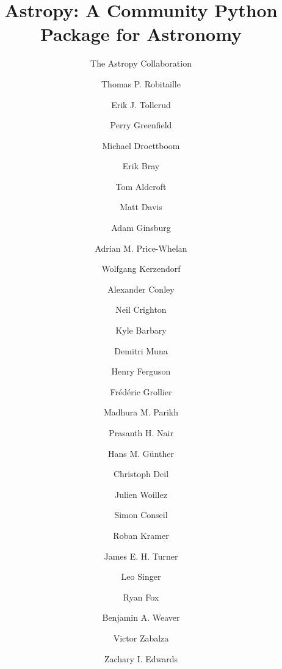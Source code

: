 \documentclass[traditabstract]{aa}
\begin{document}



\title{Astropy: A Community Python Package for Astronomy}




\author{
The Astropy Collaboration
  \and
Thomas P. Robitaille\inst{\ref{inst:mpia}}  %
  \and
Erik J. Tollerud\inst{\ref{inst:yale}, \ref{inst:hubble}}  %
  \and
Perry Greenfield\inst{\ref{inst:stsci}}  %
  \and
Michael Droettboom\inst{\ref{inst:stsci}}  %
  \and
Erik Bray\inst{\ref{inst:stsci}}  %
  \and
Tom Aldcroft\inst{\ref{inst:cfa}}  %
  \and
Matt Davis\inst{\ref{inst:stsci}}  %
  \and
Adam Ginsburg\inst{\ref{inst:colorado}}  %
  \and
Adrian M. Price-Whelan\inst{\ref{inst:columbia}}  %
  \and
Wolfgang Kerzendorf\inst{\ref{inst:toronto}}  %
  \and
Alexander Conley\inst{\ref{inst:colorado}}  %
  \and
Neil Crighton\inst{\ref{inst:mpia}}  %
  \and
Kyle Barbary\inst{\ref{inst:argonne}}  %
  \and
Demitri Muna\inst{\ref{inst:osu}}  %
  \and
Henry Ferguson\inst{\ref{inst:stsci}}  %
  \and
Frédéric Grollier\inst{\ref{inst:freelance}}  %
  \and
Madhura M. Parikh\inst{\ref{inst:surat}}  %
  \and
Prasanth H. Nair\inst{\ref{inst:freelance}}  %
  \and
Hans M. G\"unther\inst{\ref{inst:cfa}}  %
  \and
Christoph Deil\inst{\ref{inst:mpik}}  %
  \and
Julien Woillez\inst{\ref{inst:eso_garching}}  %
  \and
Simon Conseil\inst{\ref{inst:oamp}}  %
  \and
Roban Kramer\inst{\ref{inst:eth}}  %
  \and
James E. H. Turner\inst{\ref{inst:gemini_s}}  %
  \and
Leo Singer\inst{\ref{inst:ligo}}  %
  \and
Ryan Fox\inst{\ref{inst:freelance}}  %
  \and
Benjamin A. Weaver\inst{\ref{inst:nyu}}  %
  \and
Victor Zabalza\inst{\ref{inst:mpik}}  %
  \and
Zachary I. Edwards\inst{\ref{inst:louisiana}}  %
  \and
}
\end{document}
